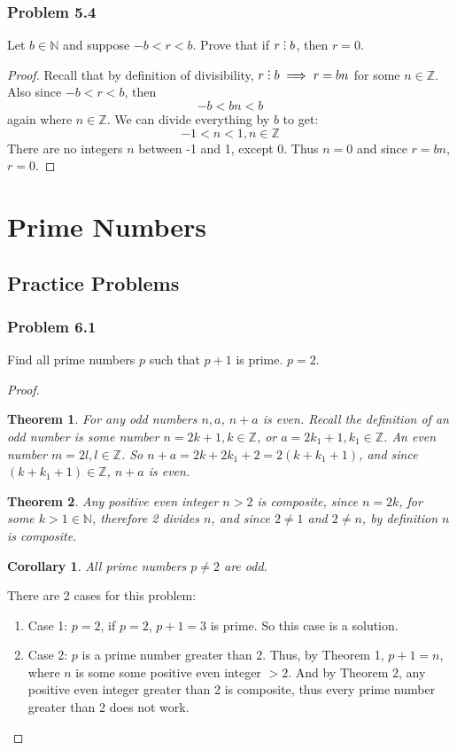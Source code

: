 \documentclass[hidelinks,12pt]{article}
\newtheorem{theorem}{Theorem}
\newtheorem{corollary}{Corollary}[theorem]
\newcommand{\N}{\mathbb{N}}
\newcommand{\Z}{\mathbb{Z}}
\newcommand{\divby}{%
  \mathrel{\text{\vbox{\baselineskip.65ex\lineskiplimit0pt\hbox{.}\hbox{.}\hbox{.}}}}%
  }
\begin{document}
\subsubsection{Problem 5.4}
Let $b\in\N$ and suppose $-b<r<b$. Prove that if $r\divby b$, then $r=0$.
\begin{proof}
Recall that by definition of divisibility, $r\divby b\implies r=bn$ for some $n\in\Z$. Also since $-b<r<b$, then $$-b<bn<b$$ again where $n\in\Z$. We can divide everything by $b$ to get:$$-1<n<1, n\in\Z$$There are no integers $n$ between -1 and 1, except 0. Thus $n=0$ and since $r=bn$, $r=0$.
\end{proof}
\newpage
\section{Prime Numbers}
\subsection{Practice Problems}
\subsubsection{Problem 6.1}
Find all prime numbers $p$ such that $p+1$ is prime.
\newline $p=2$.
\begin{proof}
\begin{theorem}
For any odd numbers $n,a$, $n+a$ is even. Recall the definition of an odd number is some number $n=2k+1,k\in\Z$, or $a=2k_1+1,k_1\in\Z$. An even number $m=2l,l\in\Z$. So $n+a=2k+2k_1+2=2(k+k_1+1)$, and since $(k+k_1+1)\in\Z$, $n+a$ is even.
\end{theorem}
\begin{theorem}
\label{thm2}
Any positive even integer $n>2$ is composite, since $n=2k$, for some $k>1\in\N$, therefore 2 divides $n$, and since $2\neq1$ and $2\neq n$, by definition $n$ is composite.
\end{theorem}
\begin{corollary}
All prime numbers $p\neq2$ are odd.
\end{corollary}
There are 2 cases for this problem:
\begin{enumerate}
    \item Case 1: $p=2$, if $p=2$, $p+1=3$ is prime. So this case is a solution.
    \item Case 2: $p$ is a prime number greater than 2. Thus, by Theorem 1, $p+1=n$, where $n$ is some some positive even integer $>2$. And by Theorem 2, any positive even integer greater than 2 is composite, thus every prime number greater than 2 does not work.
\end{enumerate}
\end{proof}
\end{document}

